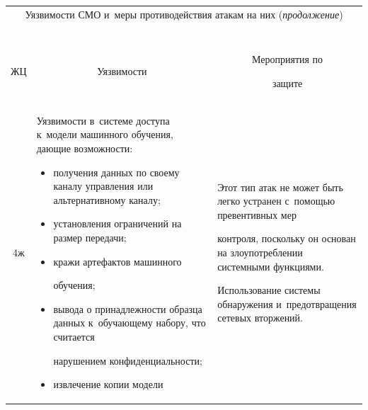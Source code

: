 \begin{table}\small 

\label{s4}

\begin{center}

\tabcolsep=3pt

\begin{tabular}{|c|p{58mm}|p{58mm}|}

\multicolumn{3}{c}{Уязвимости СМО и~меры противодействия атакам на них (\textit{продолжение})}\\

\multicolumn{3}{c}{\ }\\[-6pt]

\hline

ЖЦ&\multicolumn{1}{c|}{Уязвимости}&\multicolumn{1}{c|}{Мероприятия по 

защите}\\

\hline

4ж&Уязвимости в~системе доступа к~модели машинного обуче\-ния, дающие возможности:\vspace*{-6pt}

\begin{itemize}

\addtolength{\itemsep}{-6pt}

\item получения данных по своему каналу управ\-ле\-ния или альтернативному каналу;

\item установления ограничений на размер передачи; 

\item кражи артефактов машинного  

обуче\-ния;

\item вывода о принадлежности образца данных к~обуча\-юще\-му набору, что считается 

нарушением конфиденциальности;

\item извлечение копии модели\vspace*{-6pt}

\end{itemize}&Этот тип атак не может быть легко устранен с~помощью превентивных мер 

контроля, поскольку он основан на злоупотреблении системными функциями.\newline

Использование системы обнаружения и~предотвращения сетевых вторжений. \newline


\end{tabular}
\end{center}
\end{table}
